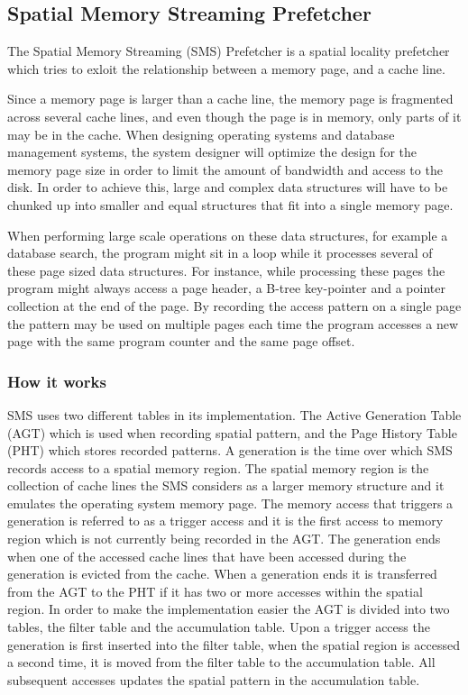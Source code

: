 \subsection{Spatial Memory Streaming Prefetcher}
\label{sec:smsPrefetcher}

The Spatial Memory Streaming (SMS) Prefetcher is a spatial locality
prefetcher which tries to exloit the relationship between a memory
page, and a cache line. 

Since a memory page is larger than a cache line, the memory page is
fragmented across several cache lines, and even though the page is in
memory, only parts of it may be in the cache.  When designing
operating systems and database management systems, the system designer
will optimize the design for the memory page size in order to limit
the amount of bandwidth and access to the disk. In order to achieve
this, large and complex data structures will have to be chunked up into
smaller and equal structures that fit into a single memory page.

When performing large scale operations on these data structures, for
example a database search, the program might sit in a loop while it
processes several of these page sized data structures. For instance,
while processing these pages the program might always access a page
header, a B-tree key-pointer and a pointer collection at the end of
the page. By recording the access pattern on a single page the pattern may
be used on multiple pages each time the program accesses a new page
with the same program counter and the same page offset.

\subsubsection{How it works}
SMS uses two different tables in its implementation. The Active
Generation Table (AGT) which is used when recording spatial pattern,
and the Page History Table (PHT) which stores recorded patterns. A
generation is the time over which SMS records access to a spatial
memory region. The spatial memory region is the collection of cache
lines the SMS considers as a larger memory structure and it emulates
the operating system memory page. The memory access that triggers a
generation is referred to as a trigger access and it is the first
access to memory region which is not currently being recorded in the
AGT. The generation ends when one of the accessed cache lines that
have been accessed during the generation is evicted from the cache.
When a generation ends it is transferred from the AGT to the PHT if it
has two or more accesses within the spatial region. In order to make
the implementation easier the AGT is divided into two tables, the
filter table and the accumulation table.  Upon a trigger access the
generation is first inserted into the filter table, when the spatial
region is accessed a second time, it is moved from the filter table to
the accumulation table. All subsequent accesses updates the spatial
pattern in the accumulation table.


